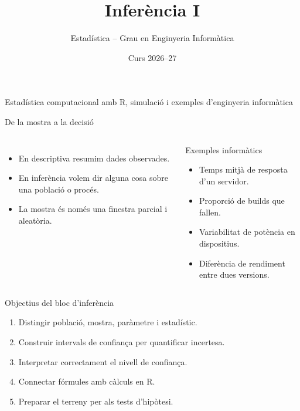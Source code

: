 \documentclass[10pt,aspectratio=169]{beamer}
\title[Inferència I]{Inferència I}
\author{Estadística -- Grau en Enginyeria Informàtica}
\date{Curs 2026--27}
\newcommand{\R}{\textsf{R}}
\begin{document}
\begin{frame}[plain]
  \titlepage
  \vspace{-0.45cm}
  \begin{center}
  \small\textcolor{DeepBlue}{Estadística computacional amb \R, simulació i exemples d'enginyeria informàtica}
  \end{center}
\end{frame}


\begin{frame}[fragile]{De la mostra a la decisió}
\begin{columns}[T]
\begin{itemize}
  \item En descriptiva resumim dades observades.
  \item En inferència volem dir alguna cosa sobre una població o procés.
  \item La mostra és només una finestra parcial i aleatòria.
\end{itemize}
\begin{block}{Exemples informàtics}
\begin{itemize}
  \item Temps mitjà de resposta d'un servidor.
  \item Proporció de builds que fallen.
  \item Variabilitat de potència en dispositius.
  \item Diferència de rendiment entre dues versions.
\end{itemize}
\end{block}
\end{columns}
\end{frame}

\begin{frame}[fragile]{Objectius del bloc d'inferència}
\begin{enumerate}
  \item Distingir població, mostra, paràmetre i estadístic.
  \item Construir intervals de confiança per quantificar incertesa.
  \item Interpretar correctament el nivell de confiança.
  \item Connectar fórmules amb càlculs en \R.
  \item Preparar el terreny per als tests d'hipòtesi.
\end{enumerate}
\end{frame}
\end{document}
